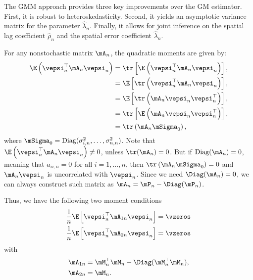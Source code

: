 \documentclass[english,12pt]{book}\usepackage[]{graphicx}\usepackage[]{xcolor}
\begin{document}
The GMM approach provides three key improvements over the GM estimator. First, it is robust to heteroskedasticity. Second, it yields an asymptotic variance matrix for the parameter $\widehat{\lambda}_n$. Finally, it allows for joint inference on the spatial lag coefficient $\widehat{\rho}_n$ and the spatial error coefficient $\widehat{\lambda}_n$. 

For any nonstochastic matrix $\mA_{n}$, the quadratic moments are given by:
\begin{equation*}
\begin{aligned}
 \E\left(\vepsi_n^\top \mA_n\vepsi_n\right)& = \tr\left[\E\left(\vepsi_n^\top \mA_n\vepsi_n\right)\right], \\
 & = \E\left[\tr\left(\vepsi_n^\top \mA_n\vepsi_n\right)\right], \\
 & = \E\left[\tr\left(\mA_n\vepsi_n\vepsi_n^\top\right)\right], \\
  & = \tr\left[\E\left(\mA_n\vepsi_n\vepsi_n^\top\right)\right], \\
 & = \tr\left(\mA_n\mSigma_0\right), 
\end{aligned}
\end{equation*}
%
where $\mSigma_0 = \textrm{Diag}(\sigma_{i, n}^2, \ldots, \sigma_{n, n}^2)$. Note that $\E\left(\vepsi_n^\top \mA_n\vepsi_n\right)\neq 0$, unless $\tr(\mA_n) = 0$. But if $\textrm{Diag}(\mA_n) = 0$, meaning that $a_{ii, n} = 0$ for all $i = 1, \ldots, n$, then  $\tr\left(\mA_n\mSigma_0\right) = 0$ and $\mA_n\vepsi_n$ is uncorrelated with $\vepsi_n$. Since we need $\Diag(\mA_n) = 0$, we can always construct such matrix as $\mA_n = \mP_{n} - \Diag(\mP_n)$. 

Thus, we have the following two moment conditions
\begin{equation}\label{eq:moment_conditions_reduced}
	\begin{aligned}
\frac{1}{n}\E\left[\vepsi_n^\top\mA_{1n}\vepsi_n\right] & =  \vzeros \\
\frac{1}{n}\E\left[\vepsi_n^\top\mA_{2n}\vepsi_n\right] & =  \vzeros
	\end{aligned}
\end{equation}
%
with
\begin{equation*}
  \begin{aligned}
\mA_{1n} &= \mM^\top_n\mM_n - \Diag(\mM^\top_n\mM_n), \\
\mA_{2n} &= \mM_n.
\end{aligned}
\end{equation*}

\end{document}
